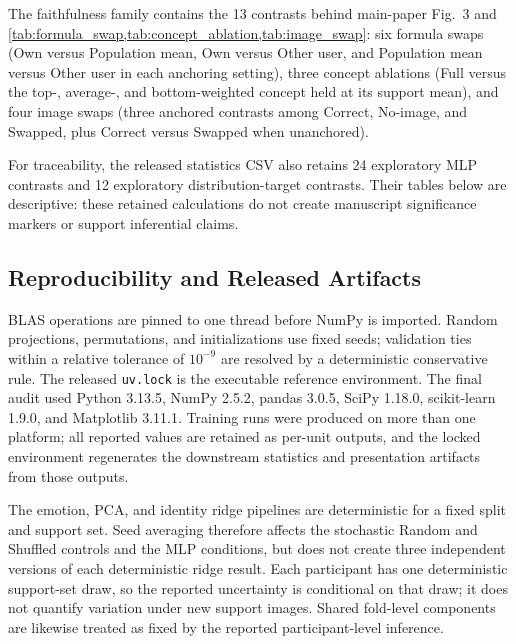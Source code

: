 \documentclass[10pt,twocolumn,letterpaper]{article}
\begin{document}
The faithfulness family contains the 13 contrasts behind main-paper Fig.~3
and \cref{tab:formula_swap,tab:concept_ablation,tab:image_swap}: six formula
swaps (Own versus Population mean, Own versus Other user, and Population mean
versus Other user in each anchoring setting), three concept ablations (Full
versus the top-, average-, and bottom-weighted concept held at its support
mean), and four image swaps (three anchored contrasts among Correct, No-image,
and Swapped, plus Correct versus Swapped when unanchored).

For traceability, the released statistics CSV also retains 24 exploratory
MLP contrasts and 12 exploratory distribution-target contrasts. Their tables
below are descriptive: these retained calculations do not create manuscript
significance markers or support inferential claims.

\subsection{Reproducibility and Released Artifacts}

BLAS operations are pinned to one thread before NumPy is imported. Random
projections, permutations, and initializations use fixed seeds; validation
ties within a relative tolerance of $10^{-9}$ are resolved by a deterministic
conservative rule. The released \texttt{uv.lock} is the executable reference
environment. The final audit used Python 3.13.5, NumPy 2.5.2, pandas 3.0.5,
SciPy 1.18.0, scikit-learn 1.9.0, and Matplotlib 3.11.1. Training runs were
produced on more than one platform; all reported values are retained
as per-unit outputs, and the locked environment regenerates the downstream
statistics and presentation artifacts from those outputs.

The emotion, PCA, and identity ridge pipelines are deterministic for a fixed
split and support set. Seed averaging therefore affects the stochastic Random
and Shuffled controls and the MLP conditions, but does not create three
independent versions of each deterministic ridge result. Each participant has
one deterministic support-set draw, so the reported uncertainty is conditional
on that draw; it does not quantify variation under new support images. Shared
fold-level components are likewise treated as fixed by the reported
participant-level inference.
\end{document}
